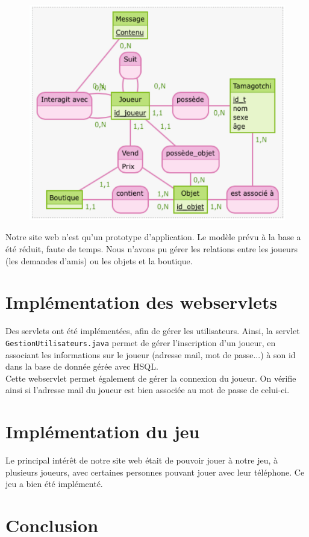\documentclass[11pt,a4paper]{report}
\begin{document}
\begin{figure}[h!]
\begin{center}
\includegraphics[scale=0.5]{Schemabdd.png}
\end{center}
\end{figure}


Notre site web n'est qu'un prototype d'application.
Le modèle prévu à la base a été réduit, faute de temps. Nous n'avons pu gérer les relations entre les joueurs (les demandes d'amis) ou les objets et la boutique.

\section{Implémentation des webservlets}

Des servlets ont été implémentées, afin de gérer les utilisateurs. Ainsi, la servlet \texttt{GestionUtilisateurs.java} permet de gérer l'inscription d'un joueur, en associant les informations sur le joueur (adresse mail, mot de passe...) à son id dans la base de donnée gérée avec HSQL.\\
Cette webservlet permet également de gérer la connexion du joueur. On vérifie ainsi si l'adresse mail du joueur est bien associée au mot de passe de celui-ci.\\


\section{Implémentation du jeu}

Le principal intérêt de notre site web était de pouvoir jouer à notre jeu, à plusieurs joueurs, avec certaines personnes pouvant jouer avec leur téléphone. Ce jeu a bien été implémenté.
\section*{Conclusion}
\end{document}
